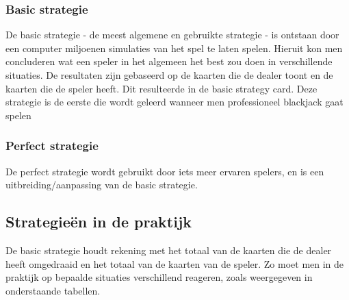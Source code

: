 \documentclass[conference]{IEEEtran}
\begin{document}
\subsubsection{Basic strategie}
De basic strategie - de meest algemene en gebruikte strategie - is ontstaan door een computer miljoenen simulaties van het spel te laten spelen. Hieruit kon men concluderen wat een speler in het algemeen het best zou doen in verschillende situaties. De resultaten zijn gebaseerd op de kaarten die de dealer toont en de kaarten die de speler heeft. Dit resulteerde in de basic strategy card. Deze strategie is de eerste die wordt geleerd wanneer men professioneel blackjack gaat spelen

\subsubsection{Perfect strategie}
De perfect strategie wordt gebruikt door iets meer ervaren spelers, en is een uitbreiding/aanpassing van de basic strategie.

\subsection{Strategie\"{e}n in de praktijk}
De basic strategie houdt rekening met het totaal van de kaarten die de dealer heeft omgedraaid en het totaal van de kaarten van de speler. Zo moet men in de praktijk op bepaalde situaties verschillend reageren, zoals weergegeven in onderstaande tabellen.
\end{document}
